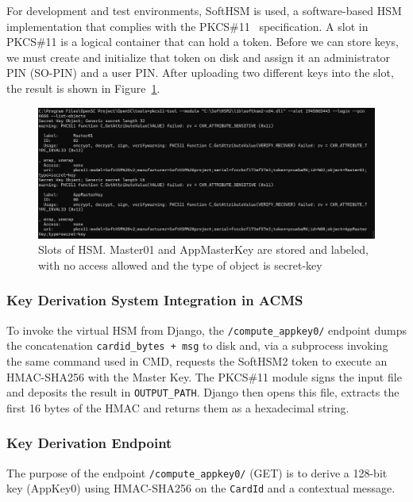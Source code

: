 For development and test environments, SoftHSM is used, a software-based HSM implementation that complies with the PKCS\#11~\cite{Ref76} specification. A slot in PKCS\#11 is a logical container that can hold a token. Before we can store keys, we must create and initialize that token on disk and assign it an administrator PIN (SO-PIN) and a user PIN. After uploading two different keys into the slot, the result is shown in Figure~\ref{fig:hsm-slots}.

\begin{figure}[H]
	\centering
	\includegraphics[width=\textwidth]{imaxes/hsm.png}
	\caption{Slots of HSM. Master01 and AppMasterKey are stored and labeled, with no access allowed and the type of object is secret-key}
	\label{fig:hsm-slots}
\end{figure}

\subsubsection{Key Derivation System Integration in ACMS}

To invoke the virtual HSM from Django, the \texttt{/compute\_appkey0/} endpoint dumps the concatenation \texttt{cardid\_bytes + msg} to disk and, via a subprocess invoking the same command used in CMD, requests the SoftHSM2 token to execute an HMAC-SHA256 with the Master Key. The PKCS\#11 module signs the input file and deposits the result in \texttt{OUTPUT\_PATH}. Django then opens this file, extracts the first 16 bytes of the HMAC and returns them as a hexadecimal string.

\subsubsection{Key Derivation Endpoint}

The purpose of the endpoint \texttt{/compute\_appkey0/} (GET) is to derive a 128-bit key (AppKey0) using HMAC-SHA256 on the \texttt{CardId} and a contextual message.

